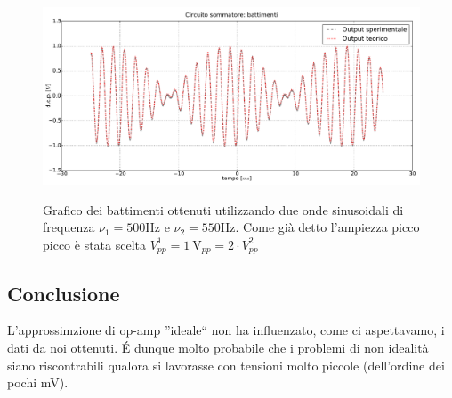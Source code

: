 \begin{figure}[ht]
 \centering
   {\includegraphics[width=15cm]{../E01/latex/battimenti_ideali.pdf}}
 \caption{Grafico dei battimenti ottenuti utilizzando due onde sinusoidali di frequenza $\nu_1=500 \si{\hertz}$ e $\nu_2=550 \si{\hertz}$. Come già detto l'ampiezza picco picco è stata scelta $V^1_{pp}=\SI{1}{\volt}_{pp} =2 \cdot V^2_{pp}$ }
 \label{gr:batt1}
\end{figure}









\subsection{Conclusione}

L'approssimzione di op-amp ''ideale`` non ha influenzato, come ci aspettavamo, i dati da noi ottenuti. \'E dunque molto probabile che i problemi di non idealità siano riscontrabili qualora si lavorasse con tensioni molto piccole (dell'ordine dei pochi \si{\milli\volt}). 












